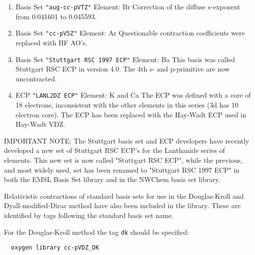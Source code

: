 \begin{enumerate}

\item Basis Set \verb#"aug-cc-pVTZ"# \newline 
 Element: Br \newline
 Correction of the diffuse s-exponent from 0.041601 to 0.045593.

\item Basis Set \verb#"cc-pV5Z"# \newline 
 Element: Ar \newline
 Questionable contraction coefficients were replaced with HF AO's.

\item Basis Set \verb#"Stuttgart RSC 1997 ECP"# \newline 
 Element: Ba \newline
 This basis was called Stuttgart RSC ECP in version 4.0.
 The 4th s- and p-primitive are now uncontracted.

\item ECP \verb#"LANL2DZ ECP"# \newline 
 Element: K and Ca \newline
 The ECP was defined with a core of 18 electrons, inconsistent with the other
 elements in this series (3d has 10 electron core). The ECP has been replaced 
 with the Hay-Wadt ECP used in Hay-Wadt VDZ.

\end{enumerate}

IMPORTANT NOTE:
The Stuttgart basis set and ECP developers have recently developed a new set of 
Stuttgart RSC ECP's for the Lanthanide series of elements. This new set is 
now called "Stuttgart RSC ECP", while the previous, and most widely used, 
set has been renamed to "Stuttgart RSC 1997 ECP" in both the EMSL Basis Set 
library and in the NWChem basis set library. 

Relativistic contractions of standard basis sets for use in the Douglas-Kroll 
and Dyall-modified-Dirac method have also been included in the library. These
are identified by tags following the standard basis set name.  \newline

For the Douglas-Kroll method the tag \verb+dk+ should be specified: 

\begin{verbatim}
  oxygen library cc-pVDZ_DK
\end{verbatim}

